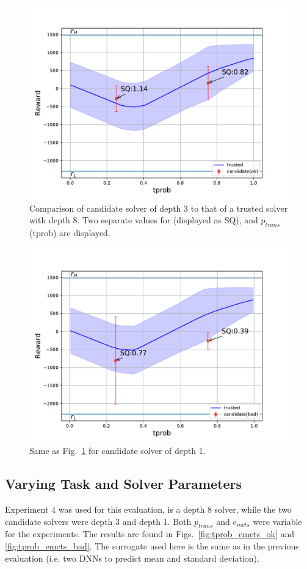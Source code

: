 \begin{figure}[tbp]
    \centering
    \includegraphics[width=0.9\linewidth]{Figures/transition_vary_tprob_ok.pdf}
    \caption{Comparison of candidate solver of depth 3 to that of a trusted solver with depth 8. Two separate values for \xQ{} (displayed as SQ), and $p_{trans}$ (tprob) are displayed.}
    \label{fig:tprob_ok}
\end{figure}
\begin{figure}[tbp]
    \centering
    \includegraphics[width=0.9\linewidth]{Figures/transition_vary_tprob_bad.pdf}
    \caption{Same as Fig.~\ref{fig:tprob_ok} for candidate solver of depth 1.}
    \label{fig:tprob_bad}
\end{figure}

\subsection{Varying Task and Solver Parameters}
Experiment 4 was used for this evaluation, \solvestar{} is a depth 8 solver, while the two candidate solvers were depth 3 and depth 1. Both $p_{trans}$ and $e_{mcts}$ were variable for the experiments. The results are found in Figs.~\ref{fig:tprob_emcts_ok} and \ref{fig:tprob_emcts_bad}. The surrogate \surrogate{} used here is the same as in the previous evaluation (i.e. two DNNs to predict mean and standard deviation).

